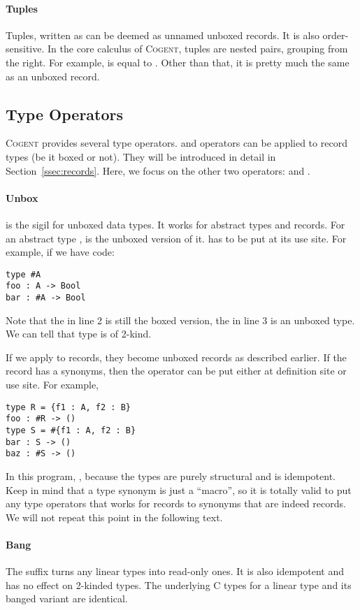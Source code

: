 \documentclass[a4paper]{article}
\newcommand{\cogent}{\textsc{Cogent}\xspace}
\begin{document}
\paragraph{Tuples} Tuples, written as  can be deemed as unnamed unboxed records. It is also order-sensitive.
In the core calculus of \cogent, tuples are nested pairs, grouping from the right. For example,  is equal to
. Other than that, it is pretty much the same as an unboxed record.

\subsection{Type Operators}
\cogent provides several type operators.  and  operators can be applied to
record types (be it boxed or not). They will be introduced in detail in Section~\ref{ssec:records}.
Here, we focus on the other two operators: \code{\#} and \code{!}.

\paragraph{Unbox} \code{\#} is the sigil for unboxed data types. It works for
abstract types and records. For an abstract type , 
is the unboxed version of it. \code{\#} has to be put at its use site.
For example, if we have code:
\begin{lstlisting}[language=Cogent]
type #A
foo : A -> Bool
bar : #A -> Bool
\end{lstlisting}
Note that the  in line 2 is still the boxed version, the  in
line 3 is an unboxed type. We can tell that type  is of 2-kind.

If we apply \code{\#} to records, they become unboxed records as described earlier.
If the record has a synonyms, then the operator can be put either at definition site
or use site. For example,
\begin{lstlisting}[language=Cogent]
type R = {f1 : A, f2 : B}
foo : #R -> ()
type S = #{f1 : A, f2 : B}
bar : S -> ()
baz : #S -> ()
\end{lstlisting}
In this program, , because the types are purely structural and
\code{\#} is idempotent. Keep in mind that a type synonym is just a ``macro'',
so it is totally valid to put any type operators that works for records to
synonyms that are indeed records. We will not repeat this point in the following text.

\paragraph{Bang} The \code{!} suffix turns any linear types into read-only ones.
It is also idempotent and has no effect on 2-kinded types. The underlying C types
for a linear type and its banged variant are identical.
\end{document}

